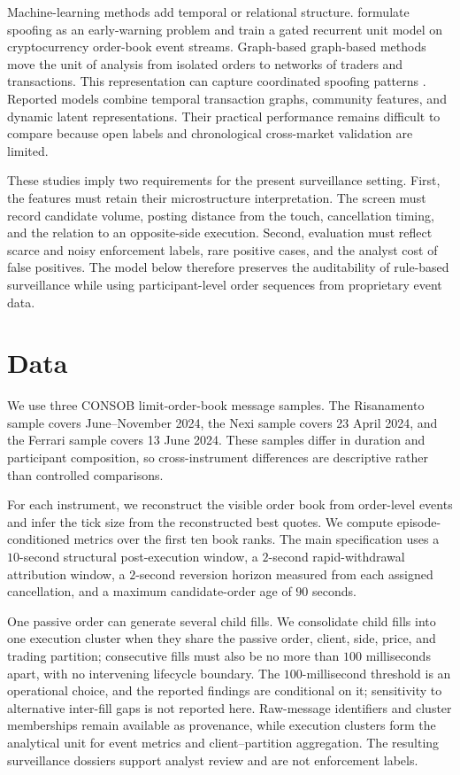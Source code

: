 \documentclass[11pt]{article}
\begin{document}
Machine-learning methods add temporal or relational structure. \cite{TuccellaNadlerSerban2021} formulate spoofing as an
early-warning problem and train a gated recurrent unit model on cryptocurrency order-book event streams. Graph-based
graph-based methods move the unit of analysis from isolated orders to networks of traders and transactions. This representation can
capture coordinated spoofing patterns \cite{KangMuNing2023,KangMuNing2024,XiangEtAl2025}. Reported models combine
temporal transaction graphs, community features, and dynamic latent representations. Their practical performance remains
difficult to compare because open labels and chronological cross-market validation are limited.

These studies imply two requirements for the present surveillance setting. First, the features must retain their
microstructure interpretation. The screen must record candidate volume, posting distance from the touch, cancellation
timing, and the relation to an opposite-side execution. Second, evaluation must reflect scarce and noisy enforcement
labels, rare positive cases, and the analyst cost of false positives. The model below therefore preserves the auditability
of rule-based surveillance while using participant-level order sequences from proprietary event data.

\section{Data}
\label{sec:data}

We use three CONSOB limit-order-book message samples. The Risanamento sample covers June--November 2024, the Nexi sample
covers 23 April 2024, and the Ferrari sample covers 13 June 2024. These samples differ in duration and participant
composition, so cross-instrument differences are descriptive rather than controlled comparisons.

For each instrument, we reconstruct the visible order book from order-level events and infer the tick size from the
reconstructed best quotes. We compute episode-conditioned metrics over the first ten book ranks. The main specification
uses a $10$-second structural post-execution window, a $2$-second rapid-withdrawal attribution window, a $2$-second
reversion horizon measured from each assigned cancellation, and a maximum candidate-order age of $90$ seconds.

One passive order can generate several child fills. We consolidate child fills into one execution cluster when they share
the passive order, client, side, price, and trading partition; consecutive fills must also be no more than $100$
milliseconds apart, with no intervening lifecycle boundary. The $100$-millisecond threshold is an operational choice, and
the reported findings are conditional on it; sensitivity to alternative inter-fill gaps is not reported here. Raw-message
identifiers and cluster memberships remain available as provenance, while execution clusters form the analytical unit for
event metrics and client--partition aggregation. The resulting surveillance dossiers support analyst review and are not
enforcement labels.
\end{document}
